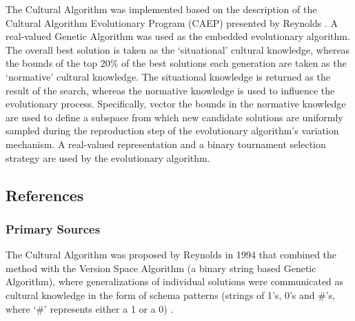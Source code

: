 The Cultural Algorithm was implemented based on the description of the Cultural Algorithm Evolutionary Program (CAEP) presented by Reynolds \cite{Reynolds1999}. 
A real-valued Genetic Algorithm was used as the embedded evolutionary algorithm.
The overall best solution is taken as the `situational' cultural knowledge, whereas the bounds of the top 20\% of the best solutions each generation are taken as the `normative' cultural knowledge. 
The situational knowledge is returned as the result of the search, whereas the normative knowledge is used to influence the evolutionary process. Specifically, vector the bounds in the normative knowledge are used to define a subspace from which new candidate solutions are uniformly sampled during the reproduction step of the evolutionary algorithm's variation mechanism. 
A real-valued representation and a binary tournament selection strategy are used by the evolutionary algorithm.



\subsection{References}

% 
% 
\subsubsection{Primary Sources}
The Cultural Algorithm was proposed by Reynolds in 1994 that combined the method with the Version Space Algorithm (a binary string based Genetic Algorithm), where generalizations of individual solutions were communicated as cultural knowledge in the form of schema patterns (strings of 1's, 0's and \#'s, where `\#' represents either a 1 or a 0) \cite{Reynolds1994}. 


